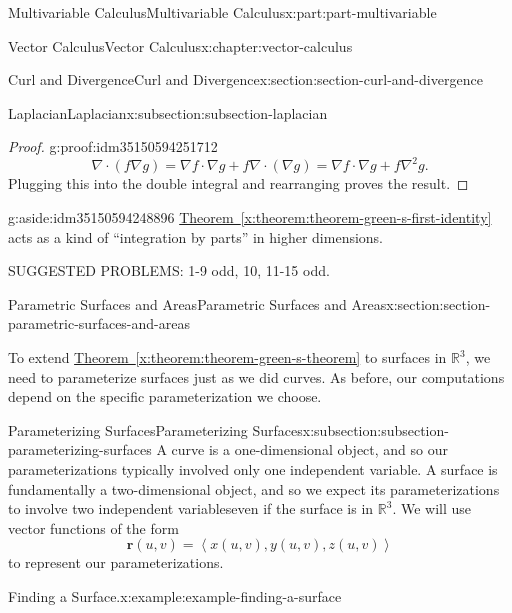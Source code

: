 \documentclass[twoside,10pt,]{book}
\newcommand{\xreffont}{\relax}
\numberwithin{equation}{part}
\newcommand{\RR}{\mathbb{R}}
\newcommand{\grad}{\nabla}
\renewcommand{\div}{\nabla\cdot}
\newcommand{\del}{\nabla}
\newcommand{\vb}[1]{\mathbf{#1}}
\newcommand{\dotprod}[1]{\left\langle #1 \right\rangle}
\begin{document}
\begin{partptx}{Multivariable Calculus}{}{Multivariable Calculus}{}{}{x:part:part-multivariable}
\begin{chapterptx}{Vector Calculus}{}{Vector Calculus}{}{}{x:chapter:vector-calculus}
\begin{sectionptx}{Curl and Divergence}{}{Curl and Divergence}{}{}{x:section:section-curl-and-divergence}
\begin{subsectionptx}{Laplacian}{}{Laplacian}{}{}{x:subsection:subsection-laplacian}
\begin{proof}{}{g:proof:idm35150594251712}
\begin{equation*}
\div(f\grad g) = \grad f\cdot \grad g + f \div(\grad g) = \grad f\cdot\grad g + f\del^{2}g\text{.}
\end{equation*}
Plugging this into the double integral and rearranging proves the result.%
\end{proof}
\begin{aside}{}{g:aside:idm35150594248896}%
\hyperref[x:theorem:theorem-green-s-first-identity]{Theorem~{\xreffont\ref{x:theorem:theorem-green-s-first-identity}}} acts as a kind of ``integration by parts'' in higher dimensions.%
\end{aside}
\end{subsectionptx}
\begin{conclusion}{}%
SUGGESTED PROBLEMS: 1-9 odd, 10, 11-15 odd.%
\end{conclusion}%
\end{sectionptx}
%
%
\typeout{************************************************}
\typeout{************************************************}
%
\begin{sectionptx}{Parametric Surfaces and Areas}{}{Parametric Surfaces and Areas}{}{}{x:section:section-parametric-surfaces-and-areas}
\begin{introduction}{}%
To extend \hyperref[x:theorem:theorem-green-s-theorem]{Theorem~{\xreffont\ref{x:theorem:theorem-green-s-theorem}}} to surfaces in \(\RR^{3}\), we need to parameterize surfaces just as we did curves. As before, our computations depend on the specific parameterization we choose.%
\end{introduction}%
%
%
\typeout{************************************************}
\typeout{************************************************}
%
\begin{subsectionptx}{Parameterizing Surfaces}{}{Parameterizing Surfaces}{}{}{x:subsection:subsection-parameterizing-surfaces}
A curve is a one-dimensional object, and so our parameterizations typically involved only one independent variable. A surface is fundamentally a two-dimensional object, and so we expect its parameterizations to involve two independent variables\textemdash{}even if the surface is in \(\RR^{3}\). We will use vector functions of the form%
\begin{equation*}
\vb{r}(u,v) = \dotprod{x(u,v), y(u,v), z(u,v)}
\end{equation*}
to represent our parameterizations.%
\begin{example}{Finding a Surface.}{x:example:example-finding-a-surface}%

\end{example}
\end{subsectionptx}
\end{sectionptx}
\end{chapterptx}
\end{partptx}
\end{document}

